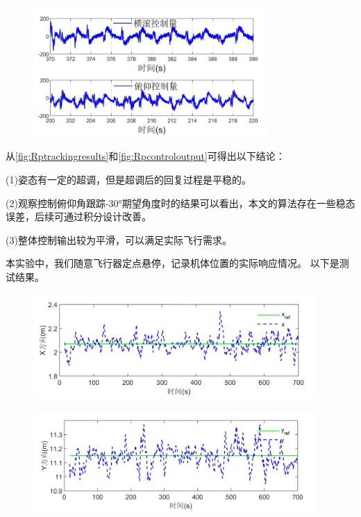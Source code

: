 \documentclass[
  type=master
]{gdutthesis}
\begin{document}
\begin{figure}[htbp]
	\centering
	\includegraphics[width=0.8\textwidth]{屏幕截图 2022-04-06 151409.png}
	\label{fig:Rpcontroloutput}
\end{figure}

从\autoref{fig:Rptrackingresults}和\autoref{fig:Rpcontroloutput}可得出以下结论：

(1)姿态有一定的超调，但是超调后的回复过程是平稳的。

(2)观察控制俯仰角跟踪-30°期望角度时的结果可以看出，本文的算法存在一些稳态误差，后续可通过积分设计改善。

(3)整体控制输出较为平滑，可以满足实际飞行需求。

本实验中，我们随意飞行器定点悬停，记录机体位置的实际响应情况。
以下是测试结果。
\begin{figure}[H]
	\centering
	\includegraphics[width=0.96\textwidth]{屏幕截图 2022-04-10 192550.png}
	\label{fig:xtrackingresults}
\end{figure}

\begin{figure}[H]
	\centering
	\includegraphics[width=0.96\textwidth]{屏幕截图 2022-04-10 193508.png}
	\label{fig:ytrackingresults}
\end{figure}
\end{document}
